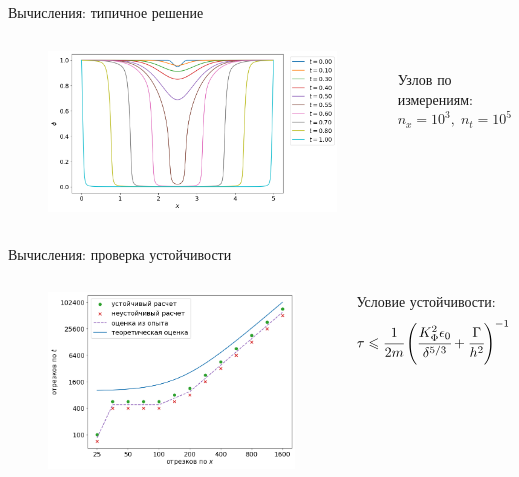 \begin{frame}{Вычисления: типичное решение}
\vspace{-0.4cm}
\begin{columns}
\begin{figure}
	\includegraphics[width=\textwidth]{figures/typical_solution.png}
\end{figure}
\hfill \\
\vspace{3.5cm}
\hspace{-2.5cm}
Узлов по измерениям: \\
\hspace{-2.5cm}
$n_x = 10^3, \; n_t = 10^5$
\end{columns}
\end{frame}


\begin{frame}{Вычисления: проверка устойчивости}
\vspace{-0.4cm}
\begin{columns}
\begin{figure}
	\includegraphics[width=\textwidth]{figures/stability_bounds.png}
\end{figure}
Условие устойчивости:
$$\tau \leqslant \cfrac{1}{2m} \left( \cfrac{K_\Phi^2 \epsilon_0}{\delta^{5/3}} +
\cfrac{\Gamma}{h^2} \right)^{-1}$$
\end{columns}
\end{frame}


